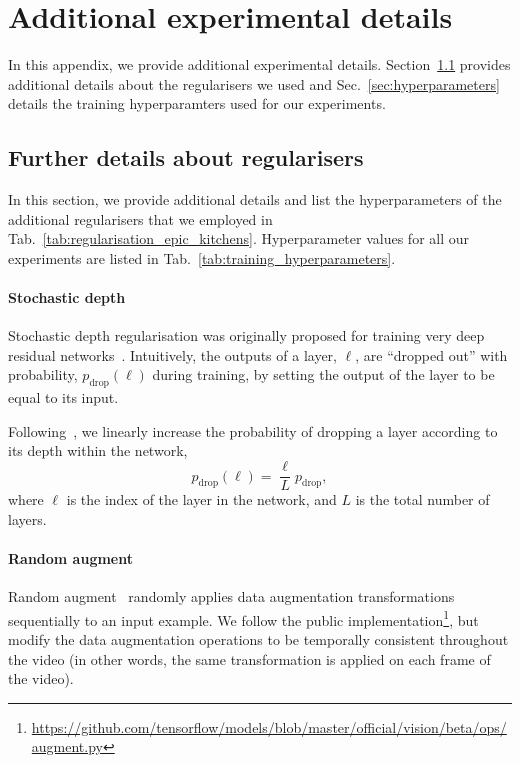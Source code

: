 \section{Additional experimental details}

In this appendix, we provide additional experimental details.
Section~\ref{sec:regulariser_details} provides additional details about the regularisers we used and Sec.~\ref{sec:hyperparameters} details the training hyperparamters used for our experiments.



\subsection{Further details about regularisers}
\label{sec:regulariser_details} 

In this section, we provide additional details and list the hyperparameters of the additional regularisers that we employed in Tab.~\ref{tab:regularisation_epic_kitchens}.
Hyperparameter values for all our experiments are listed in Tab.~\ref{tab:training_hyperparameters}.

\paragraph{Stochastic depth}

Stochastic depth regularisation was originally proposed for training very deep residual networks~\cite{huang_stochasticdepth_eccv_2016}.
Intuitively, the outputs of a layer, $\ell$, are ``dropped out'' with probability, $p_{\text{drop}}(\ell)$ during training, by setting the output of the layer to be equal to its input.

Following~\cite{huang_stochasticdepth_eccv_2016}, we linearly increase the probability of dropping a layer according to its depth within the network, 
\begin{equation}
p_{\text{drop}}(\ell) = \frac{\ell}{L} p_{\text{drop}},
\end{equation}
where $\ell$ is the index of the layer in the network, and $L$ is the total number of layers.

\paragraph{Random augment}
Random augment~\cite{cubuk_arxiv_2019} randomly applies data augmentation transformations sequentially to an input example.
We follow the public implementation\footnote{\url{https://github.com/tensorflow/models/blob/master/official/vision/beta/ops/augment.py}}, but modify the data augmentation operations to be temporally consistent throughout the video (in other words, the same transformation is applied on each frame of the video).

